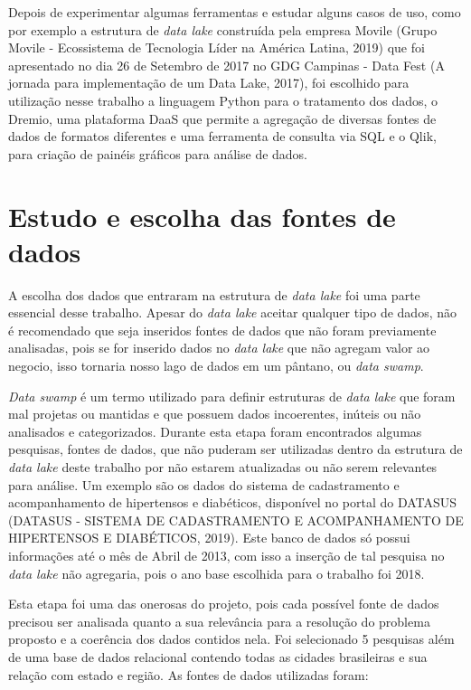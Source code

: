 \documentclass[
	12pt,				%
	openright,			%
	oneside,			%
	a4paper,			%
	chapter=TITLE,		%
	section=TITLE,		%
	subsection=TITLE,	%
	subsubsection=TITLE,%
	english,			%
	brazil				%
	]{abntex2}
\theoremstyle{definition}
\begin{document}
    Depois de experimentar algumas ferramentas e estudar alguns casos de uso, como por exemplo a estrutura de \textit{data lake} construída pela empresa Movile (Grupo Movile - Ecossistema de Tecnologia Líder na América Latina, 2019) que foi apresentado no dia 26 de Setembro de 2017 no GDG Campinas - Data Fest (A jornada para implementação de um Data Lake, 2017), foi escolhido para utilização nesse trabalho a linguagem Python para o tratamento dos dados, o Dremio, uma plataforma DaaS que permite a agregação de diversas fontes de dados de formatos diferentes e uma ferramenta de consulta via SQL e o Qlik, para criação de painéis gráficos para análise de dados.
    
\section{Estudo e escolha das fontes de dados}

    A escolha dos dados que entraram na estrutura de \textit{data lake} foi uma parte essencial desse trabalho. Apesar do \textit{data lake} aceitar qualquer tipo de dados, não é recomendado que seja inseridos fontes de dados que não foram previamente analisadas, pois se for inserido dados no \textit{data lake} que não agregam valor ao negocio, isso tornaria nosso lago de dados em um pântano, ou \textit{data swamp}. 
    
    \textit{Data swamp} é um termo utilizado para definir estruturas de \textit{data lake} que foram mal projetas ou mantidas e que possuem dados incoerentes, inúteis ou não analisados e categorizados. Durante esta etapa foram encontrados algumas pesquisas, fontes de dados, que não puderam ser utilizadas dentro da estrutura de \textit{data lake} deste trabalho por não estarem atualizadas ou não serem relevantes para análise. Um exemplo são os dados do sistema de cadastramento e acompanhamento de hipertensos e diabéticos, disponível no portal do DATASUS (DATASUS - SISTEMA DE CADASTRAMENTO E ACOMPANHAMENTO DE HIPERTENSOS E DIABÉTICOS, 2019). Este banco de dados só possui informações até o mês de Abril de 2013, com isso a inserção de tal pesquisa no \textit{data lake} não agregaria, pois o ano base escolhida para o trabalho foi 2018.
    
    Esta etapa foi uma das onerosas do projeto, pois cada possível fonte de dados precisou ser analisada quanto a sua relevância para a resolução do problema proposto e a coerência dos dados contidos nela. Foi selecionado 5 pesquisas além de uma base de dados relacional contendo todas as cidades brasileiras e sua relação com estado e região. As fontes de dados utilizadas foram:
    
\end{document}
